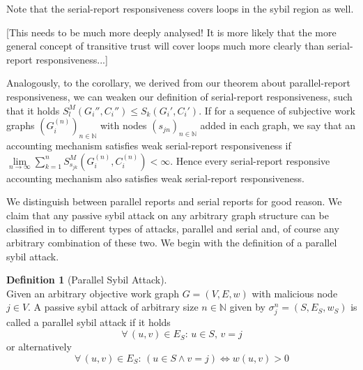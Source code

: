 \documentclass[11pt,a4paper]{report}
\theoremstyle{definition}
\newtheorem{definition}{Definition}[section]
\theoremstyle{theorem}
\theoremstyle{proposition}
\theoremstyle{corollary}
\theoremstyle{lemma}
\theoremstyle{example}
\theoremstyle{remark}
\begin{document}
\noindent{}Note that the serial-report responsiveness covers loops in the sybil region as well. \begin{center} [This needs to be much more deeply analysed! It is more likely that the more general concept of transitive trust will cover loops much more clearly than serial-report responsiveness...] \vspace{1em}\\ \end{center}

\noindent{}Analogously, to the corollary, we derived from our theorem about parallel-report responsiveness, we can weaken our definition of serial-report responsiveness, such that it holds $S^M_l(G_i'',C_i'')\leq{}S_k(G_i',C_i')$. If for a sequence of subjective work graphs $(G_i^{(n)})_{n\in\mathbb{N}}$ with nodes $(s_{jn})_{n\in\mathbb{N}}$ added in each graph, we say that an accounting mechanism satisfies weak serial-report responsiveness if $\lim\limits_{n\rightarrow\infty}\sum\limits_{k=1}^{n}S^M_{s_{jk}}(G_i^{(n)},C_i^{(n)})<\infty$. Hence every serial-report responsive accounting mechanism also satisfies weak serial-report responsiveness. 

\noindent{}We distinguish between parallel reports and serial reports for good reason. We claim that any passive sybil attack on any arbitrary graph structure can be classified in to different types of attacks, parallel and serial and, of course any arbitrary combination of these two. We begin with the definition of a parallel sybil attack.

\begin{definition}[Parallel Sybil Attack]\ \\
Given an arbitrary objective work graph $G=(V,E,w)$ with malicious node $j\in{}V$. A passive sybil attack of arbitrary size $n\in\mathbb{N}$ given by $\sigma^n_j=(S,E_S,w_S)$ is called a parallel sybil attack if it holds 
\[
\forall\,(u,v)\in{}E_S:\,u\in{}S,\,v=j
\]
or alternatively
\[
\forall\,(u,v)\in{}E_S:\,\left(u\in{}S\wedge v=j \right) \Leftrightarrow w(u,v)>0
\]
\end{definition}
\end{document}
